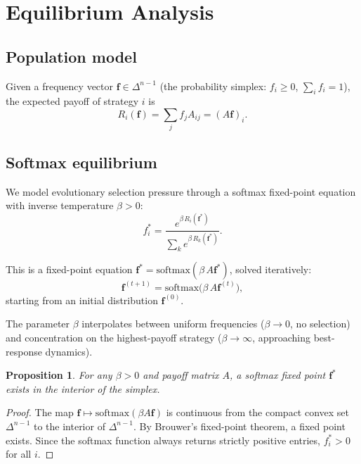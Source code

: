 \documentclass[11pt]{article}
\newtheorem{proposition}{Proposition}
\begin{document}
\section{Equilibrium Analysis}
\label{sec:equilibria}

\subsection{Population model}

Given a frequency vector
$\mathbf{f} \in \Delta^{n-1}$
(the probability simplex: $f_i \geq 0$, $\sum_i f_i = 1$),
the expected payoff of strategy $i$ is
\begin{equation}
  R_i(\mathbf{f}) = \sum_j f_j A_{ij} = (A\mathbf{f})_i.
  \label{eq:reward}
\end{equation}

\subsection{Softmax equilibrium}

We model evolutionary selection pressure through a softmax
fixed-point equation with inverse temperature $\beta > 0$:
\begin{equation}
  f_i^* = \frac{e^{\beta\, R_i(\mathbf{f}^*)}}
               {\sum_k e^{\beta\, R_k(\mathbf{f}^*)}}.
  \label{eq:softmax}
\end{equation}

This is a fixed-point equation
$\mathbf{f}^* = \mathrm{softmax}(\beta\, A \mathbf{f}^*)$,
solved iteratively:
\begin{equation}
  \mathbf{f}^{(t+1)} = \mathrm{softmax}\!\big(\beta\, A \mathbf{f}^{(t)}\big),
  \label{eq:iteration}
\end{equation}
starting from an initial distribution $\mathbf{f}^{(0)}$.

The parameter $\beta$ interpolates between uniform frequencies
($\beta \to 0$, no selection) and concentration on the
highest-payoff strategy ($\beta \to \infty$, approaching
best-response dynamics).

\begin{proposition}
For any $\beta > 0$ and payoff matrix $A$, a softmax fixed point
$\mathbf{f}^*$ exists in the interior of the simplex.
\end{proposition}

\begin{proof}
The map $\mathbf{f} \mapsto \mathrm{softmax}(\beta A \mathbf{f})$
is continuous from the compact convex set $\Delta^{n-1}$ to
the interior of $\Delta^{n-1}$.
By Brouwer's fixed-point theorem, a fixed point exists.
Since the softmax function always returns strictly positive entries,
$f_i^* > 0$ for all $i$.
\end{proof}
\end{document}
